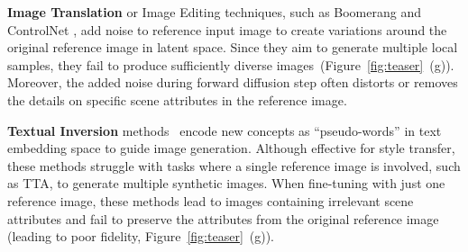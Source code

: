 \textbf{Image Translation} or Image Editing techniques, such as Boomerang \citep{pan2023boomerang} and ControlNet \citep{zhang2023adding}, add noise to reference input image to create variations around the original reference image in latent space. Since they aim to generate multiple local samples, they fail to produce sufficiently diverse images~(Figure~\ref{fig:teaser}~(g)). Moreover, the added noise during forward diffusion step often distorts or removes the details on specific scene attributes in the reference image.



\textbf{Textual Inversion} methods~\citep{gal2022image, trabucco2023effective, ahn2024dreamstyler, nguyen2024visual} encode new concepts as ``pseudo-words'' in text embedding space to guide image generation. Although effective for style transfer, these methods struggle with tasks where a single reference image is involved, such as TTA, to generate multiple synthetic images. When fine-tuning with just one reference image, these methods lead to images containing irrelevant scene attributes and fail to preserve the attributes from the original reference image (leading to poor fidelity, Figure~\ref{fig:teaser}~(g)).

